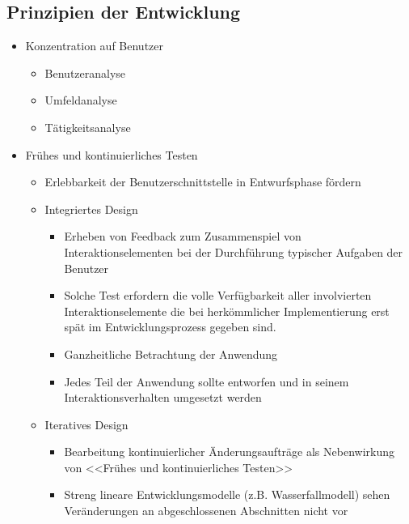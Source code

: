 \documentclass
[
	8pt,		%
	ngerman,	%
	a4paper,	%
	landscape,	%
	final		%
]{extarticle}
\begin{document}
\begin{multicols*}{4}
	\subsection{Prinzipien der Entwicklung}
	\begin{itemize}
		\item Konzentration auf Benutzer
		      \begin{itemize}[nolistsep]
			      \item Benutzeranalyse
			      \item Umfeldanalyse
			      \item Tätigkeitsanalyse
		      \end{itemize}
		\item Frühes und kontinuierliches Testen
		      \begin{itemize}[nolistsep]
			      \item Erlebbarkeit der Benutzerschnittstelle in Entwurfsphase
			            fördern
			      \item Integriertes Design
			            \begin{itemize}[nolistsep]
				            \item Erheben von Feedback zum Zusammenspiel von
				                  Interaktionselementen bei der Durchführung
				                  typischer Aufgaben der Benutzer
				            \item Solche Test erfordern die volle Verfügbarkeit
				                  aller involvierten Interaktionselemente die
				                  bei herkömmlicher Implementierung erst spät im
				                  Entwicklungsprozess gegeben sind.
				            \item  Ganzheitliche Betrachtung der Anwendung
				            \item  Jedes Teil der Anwendung sollte entworfen und
				                  in seinem Interaktionsverhalten umgesetzt
				                  werden
			            \end{itemize}
			      \item Iteratives Design
			            \begin{itemize}[nolistsep]
				            \item Bearbeitung kontinuierlicher Änderungsaufträge
				                  als Nebenwirkung von
				                  <<Frühes und kontinuierliches Testen>>
				            \item  Streng lineare Entwicklungsmodelle
				                  (z.B. Wasserfallmodell) sehen Veränderungen an
				                  abgeschlossenen Abschnitten nicht vor

\end{itemize}
\end{itemize}
\end{itemize}
\end{multicols*}
\end{document}
